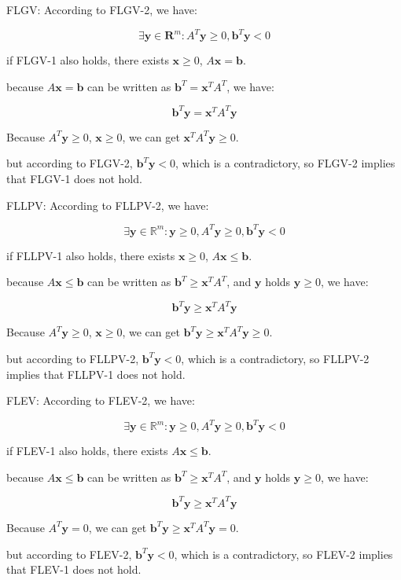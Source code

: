     FLGV: According to FLGV-2, we have:

    \[\exists \textbf{y} \in \textbf{R}^{m}: A^{T}\textbf{y} \geq 0, \textbf{b}^{T}\textbf{y} < 0 \]

    if FLGV-1 also holds, there exists $\textbf{x} \geq 0$, $A\textbf{x}=\textbf{b}$.

    because $A\textbf{x}=\textbf{b}$ can be written as $\textbf{b}^{T} = \textbf{x}^{T}A^{T}$, we have:

    \[\textbf{b}^{T}\textbf{y}=\textbf{x}^{T}A^{T}\textbf{y}\]

    Because $A^{T}\textbf{y} \geq 0$, $\textbf{x} \geq 0$, we can get $\textbf{x}^{T}A^{T}\textbf{y} \geq 0$.

    but according to FLGV-2, $\textbf{b}^{T}\textbf{y} < 0$, which is a contradictory, so FLGV-2 implies that FLGV-1 does not hold.

    FLLPV: According to FLLPV-2, we have:

    \[\exists \textbf{y} \in \mathbb{R}^{m}: \textbf{y} \geq 0, A^{T}\textbf{y} \geq 0, \textbf{b}^{T}\textbf{y} < 0 \]

    if FLLPV-1 also holds, there exists $\textbf{x} \geq 0$, $A\textbf{x} \leq \textbf{b}$.

    because $A\textbf{x} \leq \textbf{b}$ can be written as $\textbf{b}^{T} \geq \textbf{x}^{T}A^{T}$, and $\textbf{y}$ holds $\textbf{y} \geq 0$, we have:

    \[\textbf{b}^{T}\textbf{y} \geq \textbf{x}^{T}A^{T}\textbf{y}\]

    Because $A^{T}\textbf{y} \geq 0$, $\textbf{x} \geq 0$, we can get $\textbf{b}^{T}\textbf{y} \geq \textbf{x}^{T}A^{T}\textbf{y} \geq 0$.

    but according to FLLPV-2, $\textbf{b}^{T}\textbf{y} < 0$, which is a contradictory, so FLLPV-2 implies that FLLPV-1 does not hold.

    FLEV: According to FLEV-2, we have:

    \[\exists \textbf{y} \in \mathbb{R}^{m}: \textbf{y} \geq 0, A^{T}\textbf{y} \geq 0, \textbf{b}^{T}\textbf{y} < 0 \]

    if FLEV-1 also holds, there exists $A\textbf{x} \leq \textbf{b}$.

    because $A\textbf{x} \leq \textbf{b}$ can be written as $\textbf{b}^{T} \geq \textbf{x}^{T}A^{T}$, and $\textbf{y}$ holds $\textbf{y} \geq 0$, we have:

    \[\textbf{b}^{T}\textbf{y} \geq \textbf{x}^{T}A^{T}\textbf{y}\]

    Because $A^{T}\textbf{y} = 0$, we can get $\textbf{b}^{T}\textbf{y} \geq \textbf{x}^{T}A^{T}\textbf{y} = 0$.

    but according to FLEV-2, $\textbf{b}^{T}\textbf{y} < 0$, which is a contradictory, so FLEV-2 implies that FLEV-1 does not hold. 